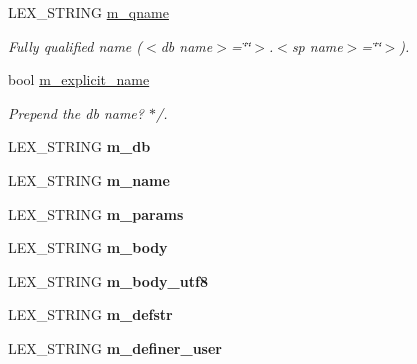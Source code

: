 \begin{DoxyCompactItemize}
\mbox{\label{classsp__head_a9b76913952fa8438a82e9461bb6cfe78}} 
L\+E\+X\+\_\+\+S\+T\+R\+I\+NG \mbox{\hyperlink{classsp__head_a9b76913952fa8438a82e9461bb6cfe78}{m\+\_\+qname}}
\begin{DoxyCompactList}\small\item\em Fully qualified name ($<$db name$>$=\char`\"{}\char`\"{}$>$.$<$sp name$>$=\char`\"{}\char`\"{}$>$). \end{DoxyCompactList}\item 
\mbox{\label{classsp__head_a7ba47e6fca020a90e6b2122c79469b7c}} 
bool \mbox{\hyperlink{classsp__head_a7ba47e6fca020a90e6b2122c79469b7c}{m\+\_\+explicit\+\_\+name}}
\begin{DoxyCompactList}\small\item\em Prepend the db name? $\ast$/. \end{DoxyCompactList}\item 
\mbox{\label{classsp__head_a683009a71fd418e423e6ae39d499a6e0}} 
L\+E\+X\+\_\+\+S\+T\+R\+I\+NG {\bfseries m\+\_\+db}
\item 
\mbox{\label{classsp__head_a1b365478f2754a77773662b238bed723}} 
L\+E\+X\+\_\+\+S\+T\+R\+I\+NG {\bfseries m\+\_\+name}
\item 
\mbox{\label{classsp__head_a5e026148fa4b066fe5b191587eaa6ea5}} 
L\+E\+X\+\_\+\+S\+T\+R\+I\+NG {\bfseries m\+\_\+params}
\item 
\mbox{\label{classsp__head_a07182a721aec32b26b05f5a9e04ba8c4}} 
L\+E\+X\+\_\+\+S\+T\+R\+I\+NG {\bfseries m\+\_\+body}
\item 
\mbox{\label{classsp__head_a2e0a379a2d7df0a03d0c1da69d441a89}} 
L\+E\+X\+\_\+\+S\+T\+R\+I\+NG {\bfseries m\+\_\+body\+\_\+utf8}
\item 
\mbox{\label{classsp__head_a524c167fb6673790421590dd56dc89f2}} 
L\+E\+X\+\_\+\+S\+T\+R\+I\+NG {\bfseries m\+\_\+defstr}
\item 
\mbox{\label{classsp__head_aafac2c7a9d6616d888c4eb2025c60d74}} 
L\+E\+X\+\_\+\+S\+T\+R\+I\+NG {\bfseries m\+\_\+definer\+\_\+user}

\end{DoxyCompactItemize}
